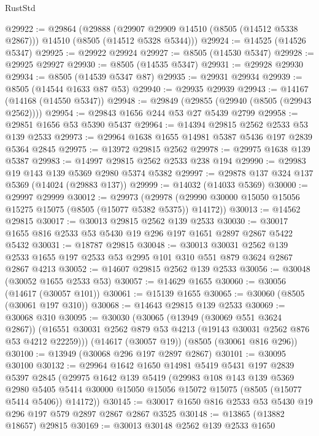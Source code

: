 \begin{lexlean}{RustStd}
\begin{coremodule}
@29922 := @29864
    (@29888 (@29907 @29909 @14510 (@8505 (@14512 @5338 @2867))) @14510 (@8505 (@14512 @5328 @5344)))
@29924 := @14525 (@14526 @5347)
@29925 := @29922 @29924
@29927 := @8505 (@14530 @5347)
@29928 := @29925 @29927
@29930 := @8505 (@14535 @5347)
@29931 := @29928 @29930
@29934 := @8505 (@14539 @5347 @87)
@29935 := @29931 @29934
@29939 := @8505 (@14544 @1633 @87 @53)
@29940 := @29935 @29939
@29943 := @14167 (@14168 (@14550 @5347))
@29948 := @29849 (@29855 (@29940 (@8505 (@29943 @2562))))
@29954 := @29843 @1656 @244 @53 @27 @5439 @2799
@29958 := @29851 @1656 @53 @5390 @5437
@29964 := @14394 @29815 @2562 @2533 @53 @139 @2533
@29973 := @29964 @1638 @1655 @14981 @5387 @5436 @197 @2839 @5364 @2845
@29975 := @13972 @29815 @2562
@29978 := @29975 @1638 @139 @5387
@29983 := @14997 @29815 @2562 @2533 @238 @194
@29990 := @29983 @19 @143 @139 @5369 @2980 @5374 @5382
@29997 := @29878 @137 @324 @137 @5369 (@14024 (@29883 @137))
@29999 := @14032 (@14033 @5369)
@30000 := @29997 @29999
@30012 := @29973
    (@29978 (@29990 @30000 @15050 @15056 @15275 @15075 (@8505 (@15077 @5382 @5375)) @14172))
@30013 := @14562 @29815
@30017 := @30013 @29815 @2562 @139 @2533
@30030 := @30017 @1655 @816 @2533 @53 @5430 @19 @296 @197 @1651 @2897 @2867 @5422 @5432
@30031 := @18787 @29815
@30048 := @30013
    @30031
    @2562
    @139
    @2533
    @1655
    @197
    @2533
    @53
    @2995
    @101
    @310
    @551
    @879
    @3624
    @2867
    @2867
    @4213
@30052 := @14607 @29815 @2562 @139 @2533
@30056 := @30048 (@30052 @1655 @2533 @53)
@30057 := @14629 @1655
@30060 := @30056 (@14617 (@30057 @101))
@30061 := @15139 @1655
@30065 := @30060 (@8505 (@30061 @197 @310))
@30068 := @14643 @29815 @139 @2533
@30069 := @30068 @310
@30095 := @30030
    (@30065
      (@13949 (@30069 @551 @3624 @2867))
      (@16551 @30031 @2562 @879 @53 @4213 (@19143 @30031 @2562 @876 @53 @4212 @22259)))
    (@14617 (@30057 @19))
    (@8505 (@30061 @816 @296))
@30100 := @13949 (@30068 @296 @197 @2897 @2867)
@30101 := @30095 @30100
@30132 := @29964
    @1642
    @1650
    @14981
    @5419
    @5431
    @197
    @2839
    @5397
    @2845
    (@29975
      @1642
      @139
      @5419
      (@29983
        @108
        @143
        @139
        @5369
        @2980
        @5405
        @5414
        @30000
        @15050
        @15056
        @15072
        @15075
        (@8505 (@15077 @5414 @5406))
        @14172))
@30145 := @30017 @1650 @816 @2533 @53 @5430 @19 @296 @197 @579 @2897 @2867 @2867 @3525
@30148 := @13865 (@13882 @18657) @29815
@30169 := @30013
    @30148
    @2562
    @139
    @2533
    @1650

\end{coremodule}
\end{lexlean}
